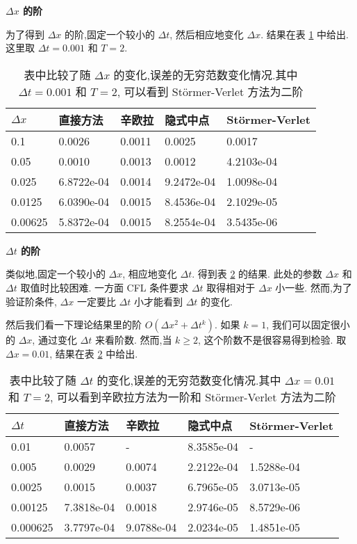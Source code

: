 \textbf{$\Delta x$ 的阶}

为了得到 $\Delta x$ 的阶,固定一个较小的 $\Delta t$, 然后相应地变化 $\Delta x$. 结果在表 \ref{tab:dx1} 中给出. 这里取 $\Delta t=0.001$ 和 $T=2$.

\begin{table}[h]
  \centering
\caption{表中比较了随 $\Delta x$ 的变化,误差的无穷范数变化情况.其中 $\Delta t=0.001$ 和 $T=2$, 可以看到 St\"{o}rmer-Verlet 方法为二阶}
\begin{tabularx}{\linewidth}{XXXXX}
 \toprule[1.5pt]
 $\Delta x$ &直接方法 & 辛欧拉 & 隐式中点 & St\"{o}rmer-Verlet\\
 \midrule[1pt]
 0.1 & 0.0026 & 0.0011 & 0.0025 & 0.0017\\
 0.05 & 0.0010 & 0.0013 & 0.0012 & 4.2103e-04\\
 0.025 & 6.8722e-04 & 0.0014 & 9.2472e-04 & 1.0098e-04\\
 0.0125 & 6.0390e-04 & 0.0015 & 8.4536e-04 & 2.1029e-05\\
 0.00625 & 5.8372e-04 & 0.0015 & 8.2554e-04 & 3.5435e-06\\
 \bottomrule[1.5pt]
\end{tabularx}
  \label{tab:dx1}
\end{table}

\textbf{$\Delta t$ 的阶}

类似地,固定一个较小的 $\Delta x$, 相应地变化 $\Delta t$. 得到表 \ref{tab:dt1} 的结果. 此处的参数 $\Delta x$ 和 $\Delta t$ 取值时比较困难. 一方面 CFL 条件要求 $\Delta t$ 取得相对于 $\Delta x$ 小一些. 然而,为了验证阶条件, $\Delta x$ 一定要比 $\Delta t$ 小才能看到 $\Delta t$ 的变化.

然后我们看一下理论结果里的阶 $O(\Delta x^2+ \Delta t^k)$. 如果 $k =
1$, 我们可以固定很小的 $\Delta x$, 通过变化 $\Delta t$ 来看阶数. 然而,当 $k \ge 2$, 这个阶数不是很容易得到检验. 取 $\Delta x = 0.01$, 结果在表 \ref{tab:dt1} 中给出.

\begin{table}[h]
  \centering
\caption{表中比较了随 $\Delta t$ 的变化,误差的无穷范数变化情况.其中 $\Delta x=0.01$ 和 $T=2$, 可以看到辛欧拉方法为一阶和 St\"{o}rmer-Verlet 方法为二阶}
\begin{tabularx}{\linewidth}{XXXXX}
 \toprule[1.5pt]
 $\Delta t$ &直接方法 & 辛欧拉 & 隐式中点 & St\"{o}rmer-Verlet\\
 \midrule[1pt]
 0.01 & 0.0057 & - & 8.3585e-04 & - \\
 0.005 & 0.0029 & 0.0074 & 2.2122e-04 & 1.5288e-04 \\
 0.0025 & 0.0015 & 0.0037 & 6.7965e-05 & 3.0713e-05 \\
 0.00125 & 7.3818e-04 & 0.0018 & 2.9746e-05 & 8.5729e-06 \\
 0.000625 & 3.7797e-04 & 9.0788e-04 & 2.0234e-05 & 1.4851e-05 \\
 \bottomrule[1.5pt]
\end{tabularx}
  \label{tab:dt1}
\end{table}

